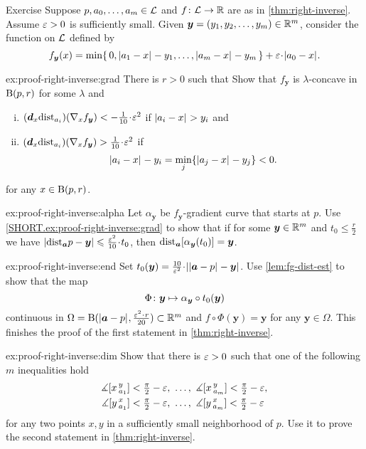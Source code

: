 \begin{thm}{Exercise}\label{ex:proof-right-inverse}
Suppose $p,a_0,\dots,a_m\in\mathcal{L}$ and $f\colon\mathcal{L}\to\mathbb{R}$ are as in \ref{thm:right-inverse}.
Assume $\varepsilon>0$ is sufficiently small.
Given $\bm{y}=(y_1,y_2,\dots,y_m)\in \mathbb{R}^m$, 
consider the function on $\mathcal{L}$ defined by
\[f_{\bm{y}}(x)=\min\{\,0, \dist{a_1}{x}{}-y_1,\dots,\dist{a_m}{x}{}-y_m\,\}+\eps\cdot\dist{a_0}{x}{}.\]

\begin{subthm}{ex:proof-right-inverse:grad}
There is $r>0$ such that 
Show that $f_{\bm{y}}$ is $\lambda$-concave in $\mathrm{B}{}(p,r)$ for some $\lambda$ and
\begin{enumerate}[(i)]
\item\label{111} $(\dd_x\distfun_{a_i})(\nabla_x f_{\bm{y}})<-\tfrac{1}{10}\cdot\eps^2$ if $\dist{a_i}{x}{}>y_i$ and
\item\label{222} $(\dd_x\distfun_{a_i})(\nabla_x f_{\bm{y}})>\tfrac{1}{10}\cdot\eps^2$ if 
\[\dist{a_i}{x}{}-y_i=\min_j\{\dist{a_j}{x}{}\z-y_j\}<0.\]
\end{enumerate}
for any $x\in \mathrm{B}{}(p,r)$.

\end{subthm}

\begin{subthm}{ex:proof-right-inverse:alpha}
Let $\alpha_{\bm{y}}$ be $f_{\bm{y}}$-gradient curve that starts at $p$.
Use \ref{SHORT.ex:proof-right-inverse:grad} to show that 
if for some $\bm{y}\in\mathbb{R}^m$ and $t_0\le\tfrac{r}{2}$ we have
$|\distfun_{\bm{a}}{p}-\bm{y}|
\le
\tfrac{\eps^2}{10}\cdot t_0$, then 
$
\mathrm{dist}_{\bm{a}}{[\alpha_{\bm{y}}(t_0)]}
= 
\bm{y}$.
\end{subthm}

\begin{subthm}{ex:proof-right-inverse:end}
Set $t_0(\bm{y})=\tfrac{10}{\eps^2}\cdot|\dist{\bm{a}}{p}{}-\bm{y}|$.
Use \ref{lem:fg-dist-est} to show that the map
\[\Phi\colon{\bm{y}}\mapsto \alpha_{\bm{y}}\circ t_0(\bm{y})\]
continuous in $\Omega=\oBall(\dist{\bm{a}}{p}{},\tfrac{\eps^2\cdot r}{20} )\subset\RR^m$
and $f\circ \Phi(\bm{y})=\bm{y}$ for any $\bm{y}\in \Omega$.
This finishes the proof of the first statement in \ref{thm:right-inverse}.
\end{subthm}

\begin{subthm}{ex:proof-right-inverse:dim}
Show that there is $\varepsilon>0$ such that one of the following $m$ inequalities hold
\begin{align*}
\measuredangle[x\,{}^{y}_{a_1}]&<\tfrac\pi2-\varepsilon,\ \dots,\  \measuredangle[x\,{}^{y}_{a_m}]<\tfrac\pi2-\varepsilon,
\\
\measuredangle[y\,{}^{x}_{a_1}]&<\tfrac\pi2-\varepsilon,\ \dots,\ \measuredangle[y\,{}^{x}_{a_m}]<\tfrac\pi2-\varepsilon
\end{align*}
for any two points $x,y$ in a sufficiently small neighborhood of $p$.
Use it to prove the second statement in \ref{thm:right-inverse}.
\end{subthm}

\end{thm}

